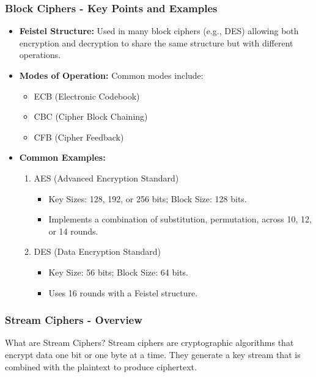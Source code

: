 \documentclass{beamer}
\begin{document}
\begin{frame}[fragile]
    \frametitle{Block Ciphers - Key Points and Examples}
    \begin{itemize}
        \item \textbf{Feistel Structure:} Used in many block ciphers (e.g., DES) allowing both encryption and decryption to share the same structure but with different operations.
        
        \item \textbf{Modes of Operation:} Common modes include:
        \begin{itemize}
            \item ECB (Electronic Codebook)
            \item CBC (Cipher Block Chaining)
            \item CFB (Cipher Feedback)
        \end{itemize}
        
        \item \textbf{Common Examples:}
        \begin{enumerate}
            \item AES (Advanced Encryption Standard)
            \begin{itemize}
                \item Key Sizes: 128, 192, or 256 bits; Block Size: 128 bits.
                \item Implements a combination of substitution, permutation, across 10, 12, or 14 rounds.
            \end{itemize}
                
            \item DES (Data Encryption Standard)
            \begin{itemize}
                \item Key Size: 56 bits; Block Size: 64 bits.
                \item Uses 16 rounds with a Feistel structure.
            \end{itemize}
        \end{enumerate}
    \end{itemize}
\end{frame}

\begin{frame}[fragile]
    \frametitle{Stream Ciphers - Overview}
    \begin{block}{What are Stream Ciphers?}
        Stream ciphers are cryptographic algorithms that encrypt data one bit or one byte at a time. They generate a key stream that is combined with the plaintext to produce ciphertext.
    \end{block}
\end{frame}
\end{document}
